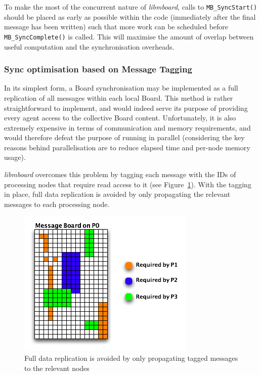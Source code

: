 To make the most of the concurrent nature of \textit{libmboard}, calls to \texttt{MB\_SyncStart()} should be placed as early as possible within the code (immediately after the final message has been written) such that more work can be scheduled before \texttt{MB\_SyncComplete()} is called. This will maximise the amount of overlap between useful computation and the synchronisation overheads.

\subsubsection{Sync optimisation based on Message Tagging}
\label{sec:mb_tagging}

In its simplest form, a Board synchronisation may be implemented as a full replication of all messages within each local Board. This method is rather straightforward to implement, and would indeed serve its purpose of providing every agent access to the collective Board content. Unfortunately, it is also extremely expensive in terms of communication and memory requirements, and would therefore defeat the purpose of running in parallel (considering the key reasons behind parallelisation are to reduce elapsed time and per-node memory usage).

\textit{libmboard} overcomes this problem by tagging each message with the IDs of processing nodes that require read access to it (see Figure~\ref{fig:taggedboard}). With the tagging in place, full data replication is avoided by only propagating the relevant messages to each processing node.

\begin{figure}[ht]
 \centering
  \includegraphics[scale=0.70]{taggedboard.png}
 \caption{Full data replication is avoided by only propagating tagged messages to the relevant nodes}
 \label{fig:taggedboard}
\end{figure}

